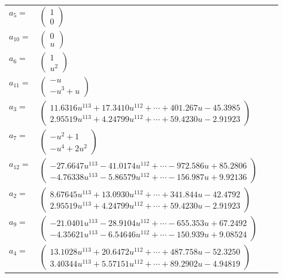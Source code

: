 \documentclass[1p]{elsarticle_modified}
\theoremstyle{definition}
\begin{document}
\begin{tabular}{m{7pt} m{180pt} m{7pt} m{180pt} }
\flushright $a_{5}=$&$\begin{pmatrix}1\\0\end{pmatrix}$ \\
\flushright $a_{10}=$&$\begin{pmatrix}0\\u\end{pmatrix}$ \\
\flushright $a_{6}=$&$\begin{pmatrix}1\\u^2\end{pmatrix}$ \\
\flushright $a_{11}=$&$\begin{pmatrix}- u\\- u^3+u\end{pmatrix}$ \\
\flushright $a_{3}=$&$\begin{pmatrix}11.6316 u^{113}+17.3410 u^{112}+\cdots+401.267 u-45.3985\\2.95519 u^{113}+4.24799 u^{112}+\cdots+59.4230 u-2.91923\end{pmatrix}$ \\
\flushright $a_{7}=$&$\begin{pmatrix}- u^2+1\\- u^4+2 u^2\end{pmatrix}$ \\
\flushright $a_{12}=$&$\begin{pmatrix}-27.6647 u^{113}-41.0174 u^{112}+\cdots-972.586 u+85.2806\\-4.76338 u^{113}-5.86579 u^{112}+\cdots-156.987 u+9.92136\end{pmatrix}$ \\
\flushright $a_{2}=$&$\begin{pmatrix}8.67645 u^{113}+13.0930 u^{112}+\cdots+341.844 u-42.4792\\2.95519 u^{113}+4.24799 u^{112}+\cdots+59.4230 u-2.91923\end{pmatrix}$ \\
\flushright $a_{9}=$&$\begin{pmatrix}-21.0401 u^{113}-28.9104 u^{112}+\cdots-655.353 u+67.2492\\-4.35621 u^{113}-6.54646 u^{112}+\cdots-150.939 u+9.08524\end{pmatrix}$ \\
\flushright $a_{4}=$&$\begin{pmatrix}13.1028 u^{113}+20.6472 u^{112}+\cdots+487.758 u-52.3250\\3.40344 u^{113}+5.57151 u^{112}+\cdots+89.2902 u-4.94819\end{pmatrix}$ \\

\end{tabular}
\end{document}
